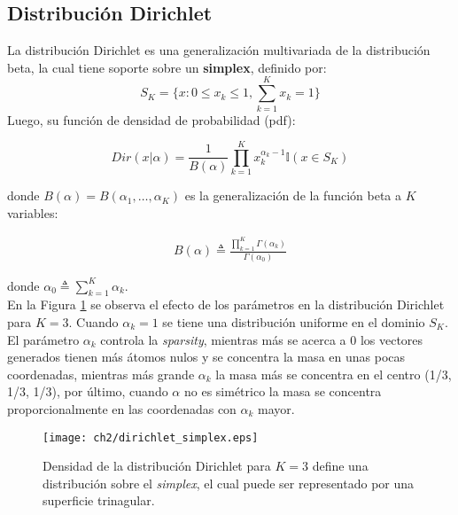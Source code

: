 \documentclass[letterpaper,12pt,oneside]{book} %
\begin{document}
\subsection{Distribución Dirichlet}
\label{sec:dirichlet}

La distribución Dirichlet \citep{minka2000estimating} es una generalización multivariada de la distribución beta, la cual tiene soporte sobre un \textbf{simplex}, definido por:
\begin{equation}
    S_{K} = \{x: 0\leq x_{k} \leq 1, \sum_{k=1}^{K}x_{k}=1\}
\end{equation}
Luego, su función de densidad de probabilidad (pdf):

\begin{equation}
    Dir(x|\alpha)=\frac{1}{B(\alpha)}\prod_{k=1}^{K}x_{k}^{\alpha_{k}-1}\mathbb{I}(x\in S_{K})
\end{equation}

donde $B(\alpha) = B(\alpha_{1}, \ldots, \alpha_{K})$ es la generalización de la función beta a $K$ variables:

\begin{align}
    B(\alpha) \triangleq \frac{\prod_{k=1}^{K}\Gamma(\alpha_{k})}{\Gamma(\alpha_{0})}
\end{align}

donde $\alpha_{0} \triangleq \sum_{k=1}^{K}\alpha_{k}$.\\

En la Figura \ref{img:dirichlet_distribution} se observa el efecto de los parámetros en la distribución Dirichlet para $K=3$. Cuando $\alpha_{k}=1$ se tiene una distribución uniforme en el dominio $S_{K}$. El parámetro $\alpha_{k}$ controla la \textit{sparsity}, mientras más se acerca a 0 los vectores generados tienen más átomos nulos y se concentra la masa en unas pocas coordenadas, mientras más grande $\alpha_{k}$ la masa más se concentra en el centro (1/3, 1/3, 1/3), por último, cuando $\alpha$ no es simétrico la masa se concentra proporcionalmente en las coordenadas con $\alpha_{k}$ mayor.\\

\begin{figure}
    \centering
    \texttt{[image: ch2/dirichlet\_simplex.eps]}
    \caption{Densidad de la distribución Dirichlet para $K=3$ define una distribución sobre el \textit{simplex}, el cual puede ser representado por una superficie trinagular.}
    \label{img:dirichlet_distribution}
\end{figure}
\end{document}
